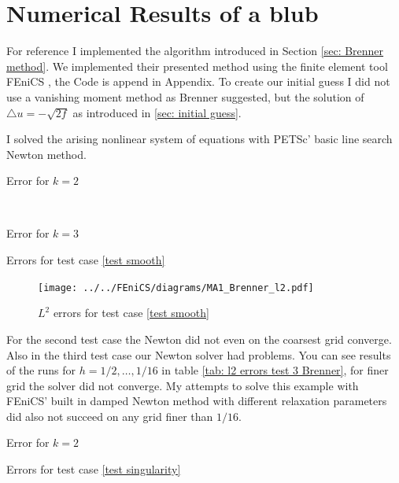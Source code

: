 \section{Numerical Results of a blub}



For reference I implemented the algorithm introduced in Section \ref{sec: Brenner method}.
We implemented their presented method using the finite element tool FEniCS \cite{FEniCS}, the Code is append in Appendix. 
To create our initial guess I did not use a vanishing moment method as Brenner suggested, but the solution of $\triangle u = -\sqrt{2f}$ as introduced in \ref{sec: initial guess}. 

I solved the arising nonlinear system of equations with PETSc' basic line search Newton method. 

\begin{table}[h]
	\begin{subtable}[b]{0.45\textwidth}
		\centering
		\pgfplotstabletypeset[columns={iterations, l2error, h1error,N},
				    every row 0 column 0/.style={set content=init},
		]\MAOneBrennerTwo
    	\caption{Error for $k=2$}
   \end{subtable}
   ~
	\begin{subtable}[b]{0.45\textwidth}
		\centering
		\pgfplotstabletypeset[columns={iterations, l2error, h1error,N},
				    every row 0 column 0/.style={set content=init},
		]\MAOneBrennerThree
 	\caption{Error for $k=3$}
	\end{subtable}
	\caption{Errors for test case \ref{test smooth}}
	\label{tab: l2 errors test 1 Brenner}
\end{table}


\begin{figure}[h!]
\centering
	\texttt{[image: ../../FEniCS/diagrams/MA1\_Brenner\_l2.pdf]}
	\caption{$L^2$ errors for test case \ref{test smooth}}
\end{figure}

For the second test case the Newton did not even on the coarsest grid converge. Also in the third test case our Newton solver had problems. You can see results of the runs for $h=1/2, \dots, 1/16$ in table \ref{tab: l2 errors test 3 Brenner}, for finer grid the solver did not converge. My attempts to solve this example with FEniCS' built in damped Newton method with different relaxation parameters did also not succeed on any grid finer than $1/16$.
\begin{table}[h]
		\centering
		\pgfplotstabletypeset[columns={iterations, l2error, h1error,N},
				    every row 0 column 0/.style={set content=init},
		]\MAThreeBrennerTwo
    	\caption{Error for $k=2$}
	\caption{Errors for test case \ref{test singularity}}
	\label{tab: l2 errors test 3 Brenner}
\end{table}

